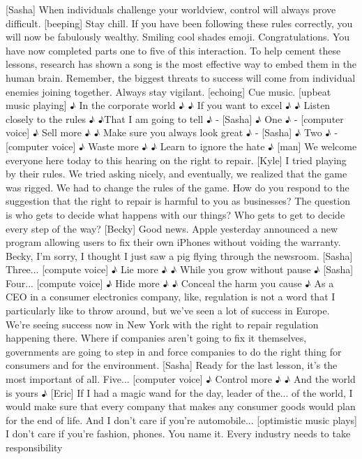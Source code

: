 \documentclass[a4paper]{article}
\begin{document}
	[Sasha] When individuals challenge your worldview,
	control will always prove difficult.
	[beeping]
	Stay chill.
	If you have been following these rules correctly,
	you will now be fabulously wealthy.
	Smiling cool shades emoji.
	Congratulations.
	You have now completed parts
	one to five of this interaction.
	To help cement these lessons,
	research has shown a song is the most effective way
	to embed them in the human brain.
	Remember, the biggest threats to success
	will come from individual enemies joining together.
	Always stay vigilant. [echoing]
	Cue music.
	[upbeat music playing]
	♪ In the corporate world ♪
	♪ If you want to excel ♪
	♪ Listen closely to the rules ♪
	♪That I am going to tell ♪
	- [Sasha] ♪ One ♪ - [computer voice] ♪ Sell more ♪
	♪ Make sure you always look great ♪
	- [Sasha] ♪ Two ♪ - [computer voice] ♪ Waste more ♪
	♪ Learn to ignore the hate ♪
	[man] We welcome everyone here today to this hearing
	on the right to repair.
	[Kyle] I tried playing by their rules.
	We tried asking nicely, and eventually, we realized that the game was rigged.
	We had to change the rules of the game.
	How do you respond to the suggestion
	that the right to repair is harmful to you as businesses?
	The question is who gets to decide what happens with our things?
	Who gets to get to decide every step of the way?
	[Becky] Good news.
	Apple yesterday announced a new program allowing users
	to fix their own iPhones without voiding the warranty.
	Becky, I'm sorry, I thought I just saw a pig flying through the newsroom.
	[Sasha] Three...
	[compute voice] ♪ Lie more ♪
	♪ While you grow without pause ♪
	[Sasha] Four...
	[compute voice] ♪ Hide more ♪
	♪ Conceal the harm you cause ♪
	As a CEO in a consumer electronics company,
	like, regulation is not a word that I particularly like to throw around,
	but we've seen a lot of success in Europe.
	We're seeing success now in New York
	with the right to repair regulation happening there.
	Where if companies aren't going to fix it themselves,
	governments are going to step in and force companies to do
	the right thing for consumers and for the environment.
	[Sasha] Ready for the last lesson, it's the most important of all.
	Five...
	[computer voice] ♪ Control more ♪
	♪ And the world is yours ♪
	[Eric] If I had a magic wand for the day,
	leader of the... of the world,
	I would make sure that every company that makes any consumer goods
	would plan for the end of life.
	And I don't care if you're automobile...
	[optimistic music plays]
	I don't care if you're fashion,
	phones.
	You name it.
	Every industry needs to take responsibility
\end{document}
